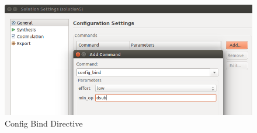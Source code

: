\begin{figure}[H]
\centering
\includegraphics[scale=0.5]{figures/config_bind.png}
\caption{Config Bind Directive}
\label{fig:configbind}
\end{figure}